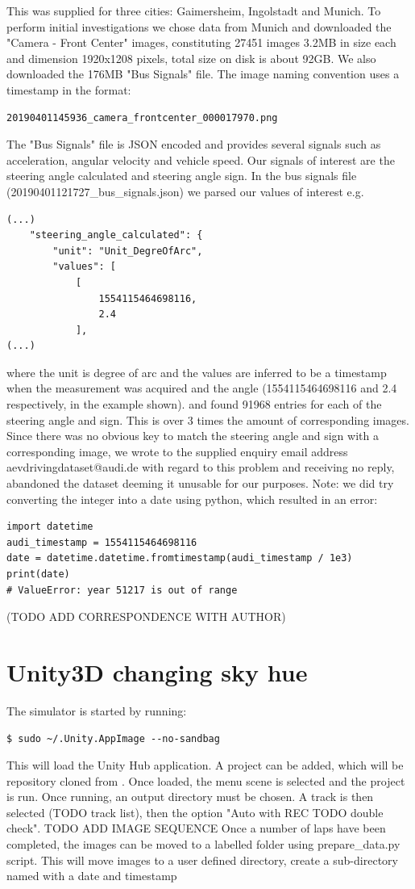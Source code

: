This was supplied for three cities: Gaimersheim, Ingolstadt and Munich. To perform initial investigations we chose data from Munich and downloaded the "Camera - Front Center" images, constituting 27451 images 3.2MB in size each and dimension 1920x1208 pixels, total size on disk is about 92GB. We also downloaded the 176MB "Bus Signals" file. The image naming convention uses a timestamp in the format:
\begin{verbatim}
20190401145936_camera_frontcenter_000017970.png
\end{verbatim}
The "Bus Signals" file is JSON encoded and provides several signals such as acceleration, angular velocity and vehicle speed. Our signals of interest are the steering angle calculated and steering angle sign. In the bus signals file (20190401121727\_bus\_signals.json) we parsed our values of interest e.g.
\begin{verbatim}
(...)
    "steering_angle_calculated": {
        "unit": "Unit_DegreOfArc",
        "values": [
            [
                1554115464698116,
                2.4
            ],
(...)
\end{verbatim}
where the unit is degree of arc and the values are inferred to be a timestamp when the measurement was acquired and the angle (1554115464698116 and 2.4 respectively, in the example shown).
and found 91968 entries for each of the steering angle and sign. This is over 3 times the amount of corresponding images. Since there was no obvious key to match the steering angle and sign with a corresponding image, we wrote to the supplied enquiry email address aevdrivingdataset@audi.de with regard to this problem and receiving no reply, abandoned the dataset deeming it unusable for our purposes.  
Note: we did try converting the integer into a date using python, which resulted in an error:
\begin{verbatim}
import datetime
audi_timestamp = 1554115464698116
date = datetime.datetime.fromtimestamp(audi_timestamp / 1e3)
print(date)
# ValueError: year 51217 is out of range    
\end{verbatim}
(TODO ADD CORRESPONDENCE WITH AUTHOR)


\section{Unity3D changing sky hue}
The simulator is started by running:
\begin{verbatim}
$ sudo ~/.Unity.AppImage --no-sandbag   
\end{verbatim}
This will load the Unity Hub application. A project can be added, which will be repository cloned from \cite{SDSandboxSim}. Once loaded, the menu scene is selected and the project is run. Once running, an output directory must be chosen. A track is then selected (TODO track list), then the option "Auto with REC TODO double check".  
TODO ADD IMAGE SEQUENCE  
Once a number of laps have been completed, the images can be moved to a labelled folder using prepare\_data.py script. This will move images to a user defined directory, create a sub-directory named with a date and timestamp

